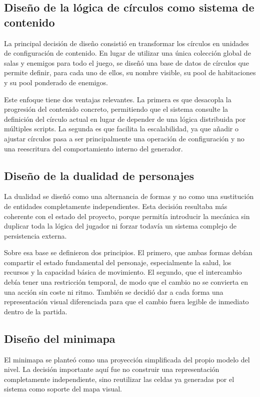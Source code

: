 \subsection{Diseño de la lógica de círculos como sistema de contenido}
La principal decisión de diseño consistió en transformar los círculos en unidades de
configuración de contenido. En lugar de utilizar una única colección global de salas y
enemigos para todo el juego, se diseñó una base de datos de círculos que permite definir,
para cada uno de ellos, su nombre visible, su pool de habitaciones y su pool ponderado de
enemigos.

Este enfoque tiene dos ventajas relevantes. La primera es que desacopla la progresión del
contenido concreto, permitiendo que el sistema consulte la definición del círculo actual en
lugar de depender de una lógica distribuida por múltiples scripts. La segunda es que
facilita la escalabilidad, ya que añadir o ajustar círculos pasa a ser principalmente una
operación de configuración y no una reescritura del comportamiento interno del generador.

\subsection{Diseño de la dualidad de personajes}
La dualidad se diseñó como una alternancia de formas y no como una sustitución de entidades
completamente independientes. Esta decisión resultaba más coherente con el estado del
proyecto, porque permitía introducir la mecánica sin duplicar toda la lógica del jugador ni
forzar todavía un sistema complejo de persistencia externa.

Sobre esa base se definieron dos principios. El primero, que ambas formas debían compartir
el estado fundamental del personaje, especialmente la salud, los recursos y la capacidad
básica de movimiento. El segundo, que el intercambio debía tener una restricción temporal,
de modo que el cambio no se convierta en una acción sin coste ni ritmo. También se decidió
dar a cada forma una representación visual diferenciada para que el cambio fuera legible de
inmediato dentro de la partida.

\subsection{Diseño del minimapa}
El minimapa se planteó como una proyección simplificada del propio modelo del nivel. La
decisión importante aquí fue no construir una representación completamente independiente,
sino reutilizar las celdas ya generadas por el sistema como soporte del mapa visual.

